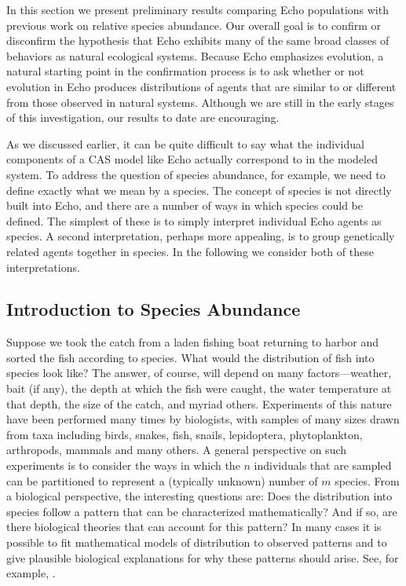 In this section we present preliminary results comparing
Echo populations with previous work on relative species
abundance.  Our overall goal is to confirm or disconfirm the
hypothesis that Echo exhibits many of the same broad classes of
behaviors as natural ecological systems.  Because Echo emphasizes
evolution, a natural starting point in the confirmation process is to
ask whether or not evolution in Echo produces distributions of agents
that are similar to or different from those observed in natural
systems.  Although we are still in the early stages of this
investigation, our results to date are encouraging.

As we discussed earlier, it can be quite difficult to say what the
individual components of a CAS model like Echo actually correspond to
in the modeled system.  To address the question of species abundance,
for example, we need to define exactly what we mean by a species.  The
concept of species is not directly built into Echo, and there are a
number of ways in which species could be defined.  The simplest of
these is to simply interpret individual Echo agents as species.  A
second interpretation, perhaps more appealing, is to group genetically
related agents together in species.  In the following we consider
both of these interpretations.

\subsection{Introduction to Species Abundance}

%

Suppose we took the catch from a laden fishing boat returning to
harbor and sorted the fish according to species. What would the
distribution of fish into species look like? The answer, of course,
will depend on many factors---weather, bait (if any), the depth at
which the fish were caught, the water temperature at that depth, the
size of the catch, and myriad others. Experiments of this nature have
been performed many times by biologists, with samples of many sizes
drawn from taxa including birds, snakes, fish, snails, lepidoptera,
phytoplankton, arthropods, mammals and many others.  A general
perspective on such experiments is to consider the ways in which the
$n$ individuals that are sampled can be partitioned to represent a
(typically unknown) number of $m$ species.  From a biological
perspective, the interesting questions are: Does the distribution
into species follow a pattern that can be characterized
mathematically? And if so, are there biological theories that can
account for this pattern?  In many cases it is possible to fit
mathematical models of distribution to observed patterns and to give
plausible biological explanations for why these patterns should arise.
See, for example,
\cite{Corbet42,FisherCorbetWilliams43,Preston48,MacArthur57,MacArthur60,Preston62a,Preston62b,Sugihara80}.

